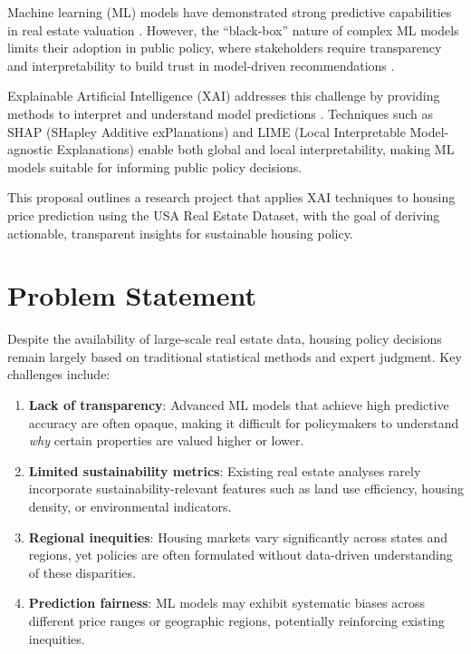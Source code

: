 \documentclass[12pt, a4paper]{article}
\begin{document}
Machine learning (ML) models have demonstrated strong predictive capabilities in real estate valuation \citep{park2015using, antipov2012mass}. However, the ``black-box'' nature of complex ML models limits their adoption in public policy, where stakeholders require transparency and interpretability to build trust in model-driven recommendations \citep{arrieta2020explainable}.

Explainable Artificial Intelligence (XAI) addresses this challenge by providing methods to interpret and understand model predictions \citep{molnar2020interpretable}. Techniques such as SHAP (SHapley Additive exPlanations) \citep{lundberg2017unified} and LIME (Local Interpretable Model-agnostic Explanations) \citep{ribeiro2016why} enable both global and local interpretability, making ML models suitable for informing public policy decisions.

This proposal outlines a research project that applies XAI techniques to housing price prediction using the USA Real Estate Dataset, with the goal of deriving actionable, transparent insights for sustainable housing policy.

\section{Problem Statement}

Despite the availability of large-scale real estate data, housing policy decisions remain largely based on traditional statistical methods and expert judgment. Key challenges include:

\begin{enumerate}[label=\arabic*.]
    \item \textbf{Lack of transparency}: Advanced ML models that achieve high predictive accuracy are often opaque, making it difficult for policymakers to understand \textit{why} certain properties are valued higher or lower.
    
    \item \textbf{Limited sustainability metrics}: Existing real estate analyses rarely incorporate sustainability-relevant features such as land use efficiency, housing density, or environmental indicators.
    
    \item \textbf{Regional inequities}: Housing markets vary significantly across states and regions, yet policies are often formulated without data-driven understanding of these disparities.
    
    \item \textbf{Prediction fairness}: ML models may exhibit systematic biases across different price ranges or geographic regions, potentially reinforcing existing inequities.
\end{enumerate}
\end{document}

